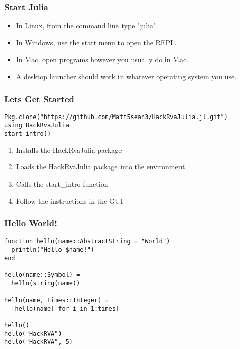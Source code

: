\documentclass{beamer}
\begin{document}
\begin{frame}
\frametitle{Start Julia}

\begin{itemize}
  \item In Linux, from the command line type "julia".
  \item In Windows, use the start menu to open the REPL.
  \item In Mac, open programs however you usually do in Mac.
  \item A desktop launcher should work in whatever operating system you use.
\end{itemize}


\end{frame}

\begin{frame}[fragile]
\frametitle{Lets Get Started}

\begin{verbatim}
Pkg.clone("https://github.com/Matt5sean3/HackRvaJulia.jl.git")
using HackRvaJulia
start_intro()
\end{verbatim}

\begin{enumerate}
  \item Installs the HackRvaJulia package
  \item Loads the HackRvaJulia package into the environment
  \item Calls the start\_intro function
  \item Follow the instructions in the GUI
\end{enumerate}

\end{frame}

\begin{frame}[fragile]
\frametitle{Hello World!}

\begin{verbatim}
function hello(name::AbstractString = "World")
  println("Hello $name!")
end

hello(name::Symbol) =
  hello(string(name))

hello(name, times::Integer) =
  [hello(name) for i in 1:times]

hello()
hello("HackRVA")
hello("HackRVA", 5)
\end{verbatim}

\end{frame}
\end{document}
